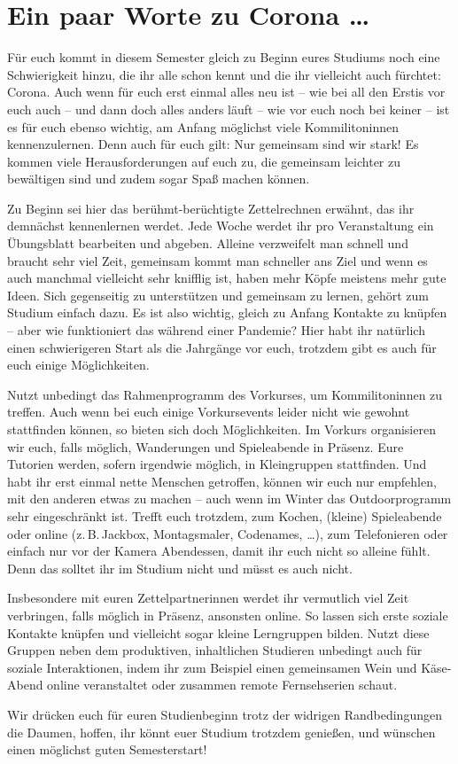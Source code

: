 \section{Ein paar Worte zu Corona \ldots}

Für euch kommt in diesem Semester gleich zu Beginn eures Studiums noch eine Schwierigkeit hinzu, die ihr alle schon kennt und die ihr vielleicht auch fürchtet: Corona.
Auch wenn für euch erst einmal alles neu ist -- wie bei all den Erstis vor euch auch -- und dann doch alles anders läuft -- wie vor euch noch bei keiner -- ist es für euch ebenso wichtig, am Anfang möglichst viele Kommilitoninnen kennenzulernen. Denn auch für euch gilt: Nur gemeinsam sind wir stark! Es kommen viele Herausforderungen auf euch zu, die gemeinsam leichter zu bewältigen sind und zudem sogar Spaß machen können.

Zu Beginn sei hier das berühmt-berüchtigte Zettelrechnen erwähnt, das ihr demnächst kennenlernen werdet. Jede Woche werdet ihr pro Veranstaltung ein Übungsblatt bearbeiten und abgeben. Alleine verzweifelt man schnell und braucht sehr viel Zeit, gemeinsam kommt man schneller ans Ziel und wenn es auch manchmal vielleicht sehr knifflig ist, haben mehr Köpfe meistens mehr gute Ideen. Sich gegenseitig zu unterstützen und gemeinsam zu lernen, gehört zum Studium einfach dazu. Es ist also wichtig, gleich zu Anfang Kontakte zu knüpfen -- aber wie funktioniert das während einer Pandemie? Hier habt ihr natürlich einen schwierigeren Start als die Jahrgänge vor euch, trotzdem gibt es auch für euch einige Möglichkeiten.

Nutzt unbedingt das Rahmenprogramm des Vorkurses, um Kommilitoninnen zu treffen. Auch wenn bei euch einige Vorkursevents leider nicht wie gewohnt stattfinden können, so bieten sich doch Möglichkeiten. Im Vorkurs organisieren wir euch, falls möglich, Wanderungen und Spieleabende in Präsenz.
Eure Tutorien werden, sofern irgendwie möglich, in Kleingruppen stattfinden.
Und habt ihr erst einmal nette Menschen getroffen, können wir euch nur empfehlen, mit den anderen etwas zu machen -- auch wenn im Winter das Outdoorprogramm sehr eingeschränkt ist. Trefft euch trotzdem, zum Kochen, (kleine) Spieleabende oder online (z.\,B.\,Jackbox, Montagsmaler, Codenames, \ldots), zum Telefonieren oder einfach nur vor der Kamera Abendessen, damit ihr euch nicht so alleine fühlt. Denn das solltet ihr im Studium nicht und müsst es auch nicht.

Insbesondere mit euren Zettelpartnerinnen werdet ihr vermutlich viel Zeit verbringen, falls möglich in Präsenz, ansonsten online. So lassen sich erste soziale Kontakte knüpfen und vielleicht sogar kleine Lerngruppen bilden. Nutzt diese Gruppen neben dem produktiven, inhaltlichen Studieren unbedingt auch für soziale Interaktionen, indem ihr zum Beispiel einen gemeinsamen Wein und Käse-Abend online veranstaltet oder zusammen remote Fernsehserien schaut.

Wir drücken euch für euren Studienbeginn trotz der widrigen Randbedingungen die Daumen, hoffen, ihr könnt euer Studium trotzdem genießen, und wünschen einen möglichst guten Semesterstart!